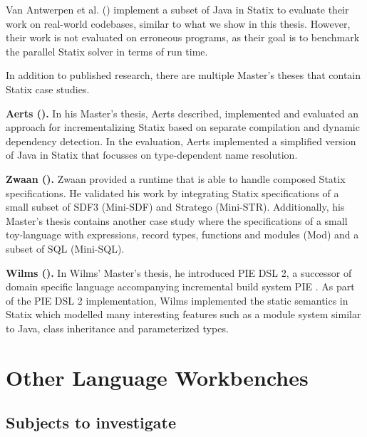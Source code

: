       Van Antwerpen et al. (\citeyear{AntwerpenV21}) implement a subset of Java in Statix to evaluate their work on real-world codebases, similar to what we show in this thesis. However, their work is not evaluated on erroneous programs, as their goal is to benchmark the parallel Statix solver in terms of run time.

      In addition to published research, there are multiple Master's theses that contain Statix case studies.

      \textbf{Aerts (\citeyear{Aerts2019}).} In his Master's thesis, Aerts described, implemented and evaluated an approach for incrementalizing Statix based on separate compilation and dynamic dependency detection. In the evaluation, Aerts implemented a simplified version of Java in Statix that focusses on type-dependent name resolution.
  
      \textbf{Zwaan (\citeyear{Zwaan2021}).} Zwaan provided a runtime that is able to handle composed Statix specifications. He validated his work by integrating Statix specifications of a small subset of SDF3 (Mini-SDF) and Stratego (Mini-STR). Additionally, his Master's thesis contains another case study where the specifications of a small toy-language with expressions, record types, functions and modules (Mod) and a subset of SQL (Mini-SQL).
  
      \textbf{Wilms (\citeyear{Wilms2022}).} In Wilms' Master's thesis, he introduced PIE DSL 2, a successor of domain specific language accompanying incremental build system PIE \autocite{KonatSEV19}. As part of the PIE DSL 2 implementation, Wilms implemented the static semantics in Statix which modelled many interesting features such as a module system similar to Java, class inheritance and parameterized types.
    
  \section{Other Language Workbenches}

    \subsection{Subjects to investigate}

